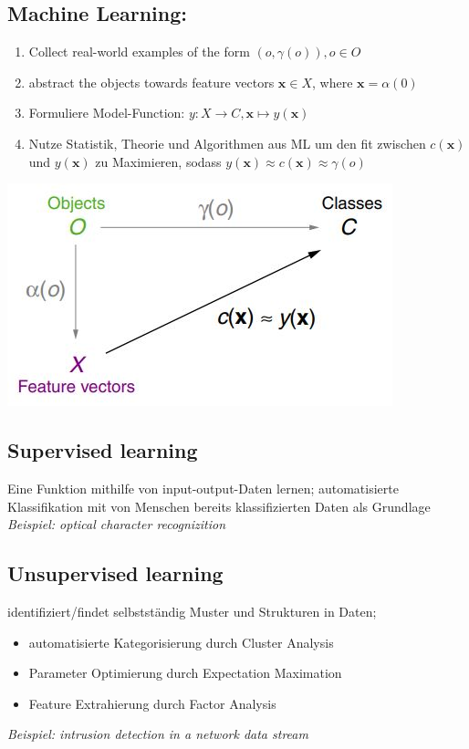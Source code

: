\documentclass[11pt,a4paper]{article}
\begin{document}
\begin{flushleft}
\subsection{Machine Learning:}
    \begin{enumerate}
    	\item Collect real-world examples of the form $(o, \gamma (o) ), o \in O $
    	\item abstract the objects towards feature vectors $ \textbf{x} \in X$, where $\textbf{x} = \alpha (0)$
        \item Formuliere Model-Function: $y: X \rightarrow C, \mathbf{x} \mapsto y(\mathbf{x})$
        \item Nutze Statistik, Theorie und Algorithmen aus ML um den fit zwischen $c(\mathbf{x})$ und $y(\mathbf{x})$ zu Maximieren, sodass $y(\textbf{x} ) \approx c( \textbf{x} ) \approx \gamma (o)$
    \end{enumerate}
    \includegraphics[width= \textwidth]{modelworld}
\subsection{Supervised learning} 
    Eine Funktion mithilfe von input-output-Daten lernen; \newline
    automatisierte Klassifikation mit von Menschen bereits klassifizierten Daten als Grundlage \newline
    \textit{Beispiel: optical character recognizition}
    
\subsection{Unsupervised learning}
    identifiziert/findet selbstständig Muster und Strukturen in Daten; \newline
    \begin{itemize}
        \item automatisierte Kategorisierung durch Cluster Analysis
        \item Parameter Optimierung durch Expectation Maximation
        \item Feature Extrahierung durch Factor Analysis
    \end{itemize}
    \textit{Beispiel: intrusion detection in a network data stream}
    

\end{flushleft}
\end{document}
